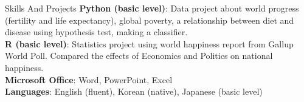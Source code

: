 \documentclass{resume}
\begin{document}
\begin{rSection}{Skills And Projects}
{\bf Python (basic level)}: Data project about world progress (fertility and life expectancy), global poverty, a relationship between diet and disease using hypothesis test, making a classifier.\\
{\bf R (basic level)}: Statistics project using world happiness report from Gallup World Poll. Compared the effects of Economics and Politics on national happiness.\\
{\bf Microsoft Office}: Word, PowerPoint, Excel\\
{\bf Languages}: English (fluent), Korean (native), Japanese (basic level)\\


\end{rSection}
\end{document}
